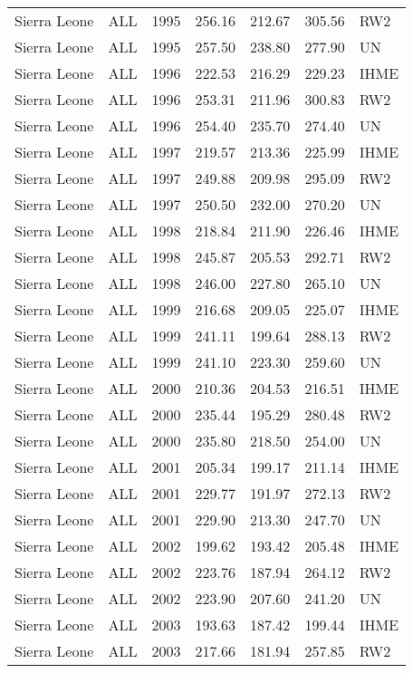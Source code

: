 \begin{longtable}{lllrrrl}
  Sierra Leone & ALL & 1995 & 256.16 & 212.67 & 305.56 & RW2 \\ 
  Sierra Leone & ALL & 1995 & 257.50 & 238.80 & 277.90 & UN \\ 
  Sierra Leone & ALL & 1996 & 222.53 & 216.29 & 229.23 & IHME \\ 
  Sierra Leone & ALL & 1996 & 253.31 & 211.96 & 300.83 & RW2 \\ 
  Sierra Leone & ALL & 1996 & 254.40 & 235.70 & 274.40 & UN \\ 
  Sierra Leone & ALL & 1997 & 219.57 & 213.36 & 225.99 & IHME \\ 
  Sierra Leone & ALL & 1997 & 249.88 & 209.98 & 295.09 & RW2 \\ 
  Sierra Leone & ALL & 1997 & 250.50 & 232.00 & 270.20 & UN \\ 
  Sierra Leone & ALL & 1998 & 218.84 & 211.90 & 226.46 & IHME \\ 
  Sierra Leone & ALL & 1998 & 245.87 & 205.53 & 292.71 & RW2 \\ 
  Sierra Leone & ALL & 1998 & 246.00 & 227.80 & 265.10 & UN \\ 
  Sierra Leone & ALL & 1999 & 216.68 & 209.05 & 225.07 & IHME \\ 
  Sierra Leone & ALL & 1999 & 241.11 & 199.64 & 288.13 & RW2 \\ 
  Sierra Leone & ALL & 1999 & 241.10 & 223.30 & 259.60 & UN \\ 
  Sierra Leone & ALL & 2000 & 210.36 & 204.53 & 216.51 & IHME \\ 
  Sierra Leone & ALL & 2000 & 235.44 & 195.29 & 280.48 & RW2 \\ 
  Sierra Leone & ALL & 2000 & 235.80 & 218.50 & 254.00 & UN \\ 
  Sierra Leone & ALL & 2001 & 205.34 & 199.17 & 211.14 & IHME \\ 
  Sierra Leone & ALL & 2001 & 229.77 & 191.97 & 272.13 & RW2 \\ 
  Sierra Leone & ALL & 2001 & 229.90 & 213.30 & 247.70 & UN \\ 
  Sierra Leone & ALL & 2002 & 199.62 & 193.42 & 205.48 & IHME \\ 
  Sierra Leone & ALL & 2002 & 223.76 & 187.94 & 264.12 & RW2 \\ 
  Sierra Leone & ALL & 2002 & 223.90 & 207.60 & 241.20 & UN \\ 
  Sierra Leone & ALL & 2003 & 193.63 & 187.42 & 199.44 & IHME \\ 
  Sierra Leone & ALL & 2003 & 217.66 & 181.94 & 257.85 & RW2 \\ 

\end{longtable}
